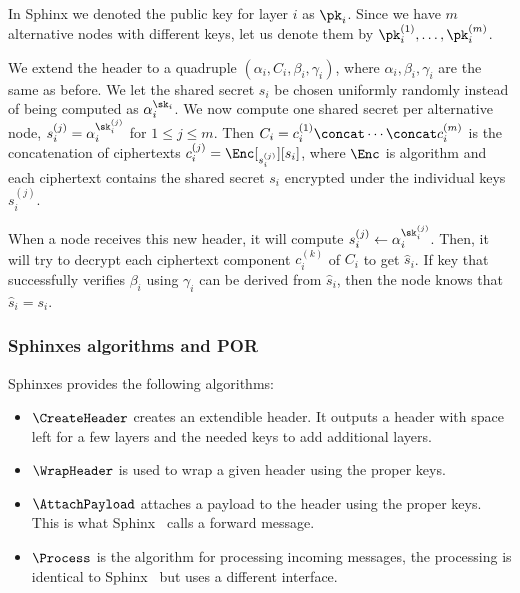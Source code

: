 In Sphinx we denoted the public key for layer \(i\) as \(\pk_i\).
Since we have \(m\) alternative nodes with different keys, let us denote them 
by \(\pk_i^{(1)}, \dotsc, \pk_i^{(m)}\).

We extend the header to a quadruple \((\alpha_i, C_i, \beta_i, \gamma_i)\), 
where \(\alpha_i, \beta_i, \gamma_i\) are the same as before.
We let the shared secret \(s_i\) be chosen uniformly randomly instead of being 
computed as \(\alpha_i^{\sk_i}\).
We now compute one shared secret per alternative node, \ie \(s_i^{(j)} = 
  \alpha_i^{\sk_i^{(j)}}\) for \(1\leq j\leq m\).
Then \(C_i = c_i^{(1)}\concat \dotsb\concat c_i^{(m)}\) is the concatenation of 
ciphertexts \(c_i^{(j)} = \Enc[_{s_i^{(j)}}][s_i]\), where \(\Enc\) is 
 algorithm and each ciphertext contains the shared secret \(s_i\) 
encrypted under the individual keys \(s_i^{(j)}\). 

When a node receives this new header, it will compute \(s_i^{(j)}\gets 
  \alpha_i^{\sk_i^{(j)}}\).
Then, it will try to decrypt each ciphertext component \(c_i^{(k)}\) of \(C_i\) 
to get \(\hat s_i\).
If  key that successfully verifies \(\beta_i\) using \(\gamma_i\) can 
be derived from \(\hat s_i\), then the node knows that \(\hat s_i = s_i\).


\subsubsection{Sphinxes algorithms and \acf*{POR}}

\NewAlgorithm{\CreateHeader}{\Sphinxes[CreateHeader]}
\NewAlgorithm{\WrapHeader}{\Sphinxes[WrapHeader]}
\NewAlgorithm{\AttachPayload}{\Sphinxes[AttachPayload]}
\NewAlgorithm{\Process}{\Sphinxes[Process]}

Sphinxes provides the following algorithms:
\begin{itemize}
  \item \(\CreateHeader\) creates an extendible header.
    It outputs a header with space left for a few layers and the needed keys to 
    add additional layers.

  \item \(\WrapHeader\) is used to wrap a given header using the proper keys.

  \item \(\AttachPayload\) attaches a payload to the header using the proper 
    keys.
    This is what Sphinx~\cite[\S 3.3]{Sphinx} calls a forward message.

  \item \(\Process\) is the algorithm for processing incoming messages, the 
    processing is identical to Sphinx~\cite[\S 3.6, \S 3.7]{Sphinx} but uses a 
    different interface.
\end{itemize}

